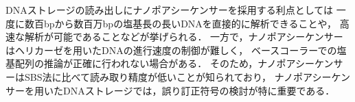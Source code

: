 \documentclass[sotsuron]{kuee}
\begin{document}
DNAストレージの読み出しにナノポアシーケンサーを採用する利点としては
一度に数百bpから数百万bpの塩基長の長いDNAを直接的に解析できることや，
高速な解析が可能であることなどが挙げられる．
一方で，ナノポアシーケンサーはヘリカーゼを用いたDNAの進行速度の制御が難しく，
ベースコーラーでの塩基配列の推論が正確に行われない場合がある．
そのため，ナノポアシーケンサーはSBS法に比べて読み取り精度が低いことが知られており，
ナノポアシーケンサーを用いたDNAストレージでは，誤り訂正符号の検討が特に重要である\cite{Amarasinghe2020,Dorey2024}．
\end{document}
